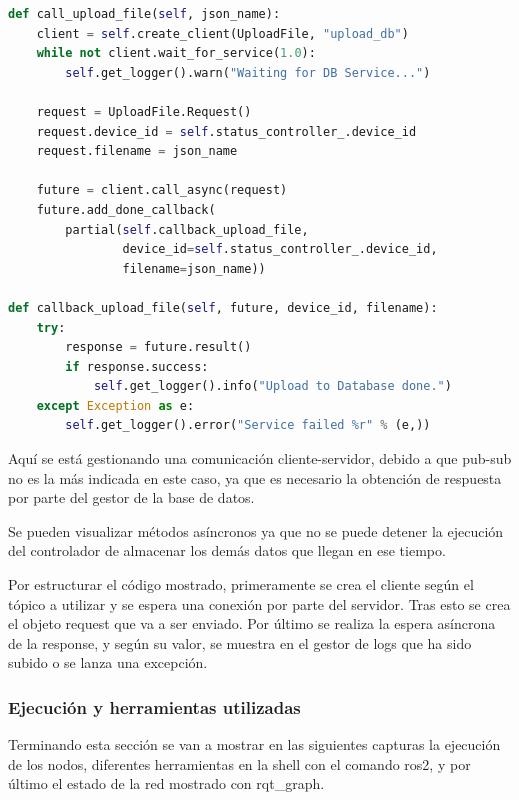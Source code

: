\begin{lstlisting}[language=Python, caption=Creación de cliente de ROS2 en Python]
def call_upload_file(self, json_name):
    client = self.create_client(UploadFile, "upload_db")
    while not client.wait_for_service(1.0):
        self.get_logger().warn("Waiting for DB Service...")

    request = UploadFile.Request()
    request.device_id = self.status_controller_.device_id
    request.filename = json_name

    future = client.call_async(request)
    future.add_done_callback(
        partial(self.callback_upload_file,
                device_id=self.status_controller_.device_id,
                filename=json_name))

def callback_upload_file(self, future, device_id, filename):
    try:
        response = future.result()
        if response.success:
            self.get_logger().info("Upload to Database done.")
    except Exception as e:
        self.get_logger().error("Service failed %r" % (e,))
\end{lstlisting}

Aquí se está gestionando una comunicación cliente-servidor, debido a que pub-sub no es la más indicada en este caso, ya que es necesario la obtención de respuesta por parte del gestor de la base de datos.

Se pueden visualizar métodos asíncronos ya que no se puede detener la ejecución del controlador de almacenar los demás datos que llegan en ese tiempo.

Por estructurar el código mostrado, primeramente se crea el cliente según el tópico a utilizar y se espera una conexión por parte del servidor. Tras esto se crea el objeto request que va a ser enviado. Por último se realiza la espera asíncrona de la response, y según su valor, se muestra en el gestor de logs que ha sido subido o se lanza una excepción.

\subsubsection{Ejecución y herramientas utilizadas}

Terminando esta sección se van a mostrar en las siguientes capturas la ejecución de los nodos, diferentes herramientas en la shell con el comando ros2, y por último el estado de la red mostrado con rqt\_graph.

\newpage

